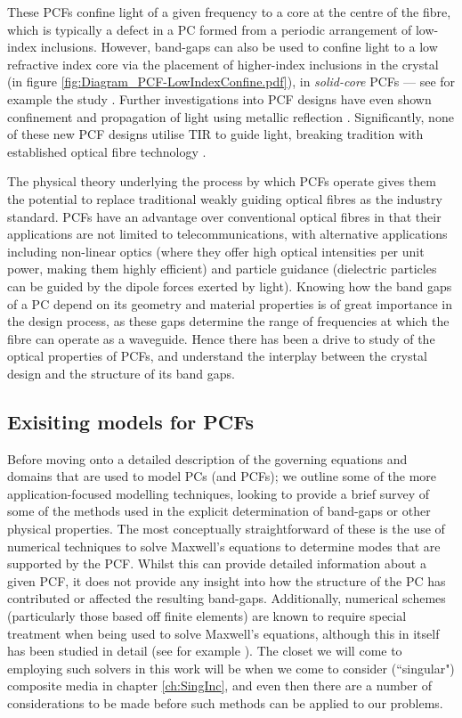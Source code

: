 These PCFs confine light of a given frequency to a core at the centre of the fibre, which is typically a defect in a PC formed from a periodic arrangement of low-index inclusions.
However, band-gaps can also be used to confine light to a low refractive index core via the placement of higher-index inclusions in the crystal (in figure \ref{fig:Diagram_PCF-LowIndexConfine.pdf}), in \emph{solid-core} PCFs --- see for example the study \cite{luan2004allsolid}.
Further investigations into PCF designs have even shown confinement and propagation of light using metallic reflection \cite{hou2008metallic}.
Significantly, none of these new PCF designs utilise TIR to guide light, breaking tradition with established optical fibre technology \cite{knight2003photonic, russell2003photonic}.

The physical theory underlying the process by which PCFs operate gives them the potential to replace traditional weakly guiding optical fibres as the industry standard.
PCFs have an advantage over conventional optical fibres in that their applications are not limited to telecommunications, with alternative applications including non-linear optics (where they offer high optical intensities per unit power, making them highly efficient) and particle guidance (dielectric particles can be guided by the dipole forces exerted by light).
Knowing how the band gaps of a PC depend on its geometry and material properties is of great importance in the design process, as these gaps determine the range of frequencies at which the fibre can operate as a waveguide.
Hence there has been a drive to study of the optical properties of PCFs, and understand the interplay between the crystal design and the structure of its band gaps.

\subsection{Exisiting models for PCFs} \label{ssec:ExistingPCFModels}
Before moving onto a detailed description of the governing equations and domains that are used to model PCs (and PCFs); we outline some of the more application-focused modelling techniques, looking to provide a brief survey of some of the methods used in the explicit determination of band-gaps or other physical properties.
The most conceptually straightforward of these is the use of numerical techniques to solve Maxwell's equations to determine modes that are supported by the PCF.
Whilst this can provide detailed information about a given PCF, it does not provide any insight into how the structure of the PC has contributed or affected the resulting band-gaps.
Additionally, numerical schemes (particularly those based off finite elements) are known to require special treatment when being used to solve Maxwell's equations, although this in itself has been studied in detail (see for example \cite{monk2003finite}).
The closet we will come to employing such solvers in this work will be when we come to consider (``singular") composite media in chapter \ref{ch:SingInc}, and even then there are a number of considerations to be made before such methods can be applied to our problems.

